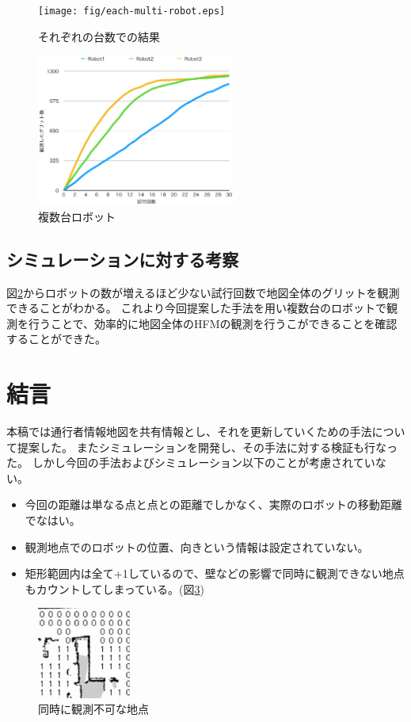 \documentclass{jsarticle}
\begin{document}
\begin{figure}[tbh]
 \centering
  \texttt{[image: fig/each-multi-robot.eps]}
  \vspace*{-4mm}
  \caption{それぞれの台数での結果}
  \label{fig: each-multirobot}
\end{figure}

\begin{figure}[tbh]
 \centering
  \includegraphics[height=50mm]{fig/multi-robot.eps}
  \vspace*{-4mm}
  \caption{複数台ロボット}
  \label{fig: multirobot}
\end{figure}


\subsection{シミュレーションに対する考察}
図\ref{fig: multirobot}からロボットの数が増えるほど少ない試行回数で地図全体のグリットを観測できることがわかる。
これより今回提案した手法を用い複数台のロボットで観測を行うことで、効率的に地図全体のHFMの観測を行うこができることを確認することができた。




\section{結言}
本稿では通行者情報地図を共有情報とし、それを更新していくための手法について提案した。
またシミュレーションを開発し、その手法に対する検証も行なった。
しかし今回の手法およびシミュレーション以下のことが考慮されていない。
\begin{itemize}
  \item 今回の距離は単なる点と点との距離でしかなく、実際のロボットの移動距離でなはい。
  \item 観測地点でのロボットの位置、向きという情報は設定されていない。
  \item 矩形範囲内は全て+1しているので、壁などの影響で同時に観測できない地点もカウントしてしまっている。(図\ref{fig: impossible})
\end{itemize}
\begin{figure}[tbh]
 \centering
  \includegraphics[height=30mm]{fig/impossible.eps}
  \vspace*{-4mm}
  \caption{同時に観測不可な地点}
  \label{fig: impossible}
\end{figure}
\end{document}
